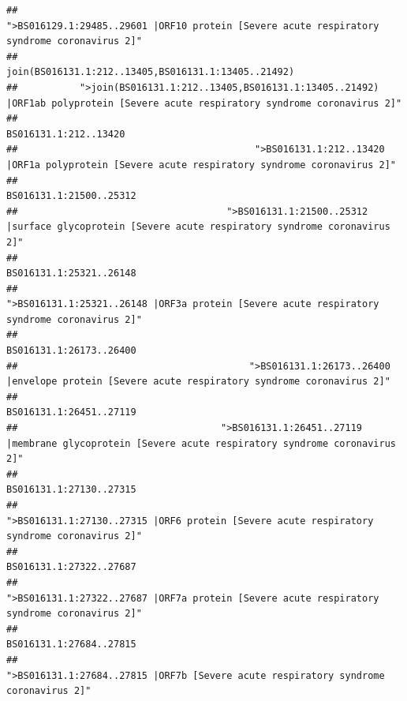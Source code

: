 \documentclass[
]{article}
\begin{document}
\begin{verbatim}
##                                            ">BS016129.1:29485..29601 |ORF10 protein [Severe acute respiratory syndrome coronavirus 2]" 
##                                                                                    join(BS016131.1:212..13405,BS016131.1:13405..21492) 
##           ">join(BS016131.1:212..13405,BS016131.1:13405..21492) |ORF1ab polyprotein [Severe acute respiratory syndrome coronavirus 2]" 
##                                                                                                                  BS016131.1:212..13420 
##                                          ">BS016131.1:212..13420 |ORF1a polyprotein [Severe acute respiratory syndrome coronavirus 2]" 
##                                                                                                                BS016131.1:21500..25312 
##                                     ">BS016131.1:21500..25312 |surface glycoprotein [Severe acute respiratory syndrome coronavirus 2]" 
##                                                                                                                BS016131.1:25321..26148 
##                                            ">BS016131.1:25321..26148 |ORF3a protein [Severe acute respiratory syndrome coronavirus 2]" 
##                                                                                                                BS016131.1:26173..26400 
##                                         ">BS016131.1:26173..26400 |envelope protein [Severe acute respiratory syndrome coronavirus 2]" 
##                                                                                                                BS016131.1:26451..27119 
##                                    ">BS016131.1:26451..27119 |membrane glycoprotein [Severe acute respiratory syndrome coronavirus 2]" 
##                                                                                                                BS016131.1:27130..27315 
##                                             ">BS016131.1:27130..27315 |ORF6 protein [Severe acute respiratory syndrome coronavirus 2]" 
##                                                                                                                BS016131.1:27322..27687 
##                                            ">BS016131.1:27322..27687 |ORF7a protein [Severe acute respiratory syndrome coronavirus 2]" 
##                                                                                                                BS016131.1:27684..27815 
##                                                    ">BS016131.1:27684..27815 |ORF7b [Severe acute respiratory syndrome coronavirus 2]" 

\end{verbatim}
\end{document}

